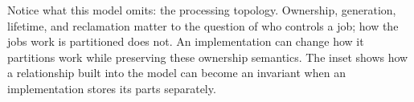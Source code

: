 
Notice what this model omits: the processing topology. Ownership, generation, lifetime, and reclamation matter to the question of who controls a job; how the job\textquotesingle s work is partitioned does not. An implementation can change how it partitions work while preserving these ownership semantics. The inset shows how a relationship built into the model can become an invariant when an implementation stores its parts separately.






